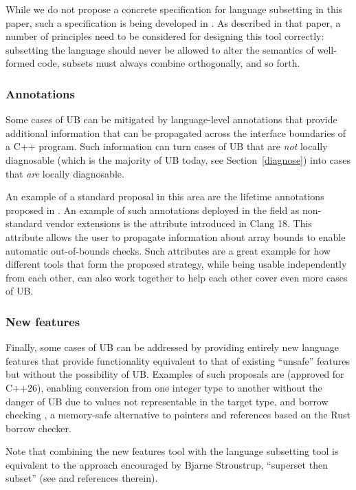 {While we do not propose a concrete specification for language subsetting in this paper, such a specification is being developed in \cite{P3716R0}. As described in that paper, a number of principles need to be considered for designing this tool correctly: subsetting the language should never be allowed to alter the semantics of well-formed code, subsets must always combine orthogonally, and so forth. 

\subsubsection{Annotations}
\label{annotations}

Some cases of UB can be mitigated by language-level annotations that provide additional information that can be propagated across the interface boundaries of a C++ program. Such information can turn cases of UB that are \emph{not} locally diagnosable (which is the majority of UB today, see Section~\ref{diagnose}) into cases that \emph{are} locally diagnosable.

An example of a standard proposal in this area are the lifetime annotations proposed in \cite{P2771R1}. An example of such annotations deployed in the field as non-standard vendor extensions is the  attribute introduced in Clang 18. This attribute allows the user to propagate information about array bounds to enable automatic out-of-bounds checks. Such attributes are a great example for how different tools that form the proposed strategy, while being usable independently from each other, can also work together to help each other cover even more cases of UB.

\subsubsection{New features}
\label{newfeatures}

Finally, some cases of UB can be addressed by providing entirely new language features that provide functionality equivalent to that of existing ``unsafe'' features but without the possibility of UB. Examples of such proposals are  \cite{P0543R3} (approved for C++26), enabling conversion from one integer type to another without the danger of UB due to values not representable in the target type, and borrow checking \cite{P3390R0}, a memory-safe alternative to pointers and references based on the Rust borrow checker.

Note that combining the new features tool with the language subsetting tool is equivalent to the approach encouraged by Bjarne Stroustrup, ``superset then subset'' (see \cite{P3650R0} and references therein).

}
